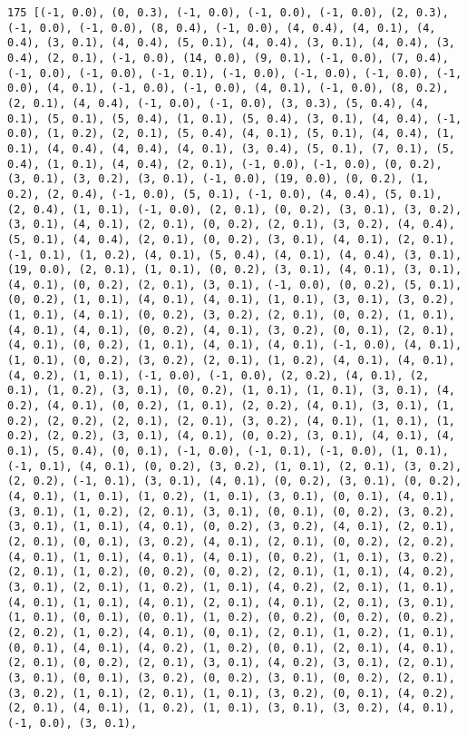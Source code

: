 \documentclass[11pt]{article}
\begin{document}
\begin{Verbatim}[commandchars=\\\{\}]
175 [(-1, 0.0), (0, 0.3), (-1, 0.0), (-1, 0.0), (-1, 0.0), (2, 0.3), (-1, 0.0), (-1, 0.0), (8, 0.4), (-1, 0.0), (4, 0.4), (4, 0.1), (4, 0.4), (3, 0.1), (4, 0.4), (5, 0.1), (4, 0.4), (3, 0.1), (4, 0.4), (3, 0.4), (2, 0.1), (-1, 0.0), (14, 0.0), (9, 0.1), (-1, 0.0), (7, 0.4), (-1, 0.0), (-1, 0.0), (-1, 0.1), (-1, 0.0), (-1, 0.0), (-1, 0.0), (-1, 0.0), (4, 0.1), (-1, 0.0), (-1, 0.0), (4, 0.1), (-1, 0.0), (8, 0.2), (2, 0.1), (4, 0.4), (-1, 0.0), (-1, 0.0), (3, 0.3), (5, 0.4), (4, 0.1), (5, 0.1), (5, 0.4), (1, 0.1), (5, 0.4), (3, 0.1), (4, 0.4), (-1, 0.0), (1, 0.2), (2, 0.1), (5, 0.4), (4, 0.1), (5, 0.1), (4, 0.4), (1, 0.1), (4, 0.4), (4, 0.4), (4, 0.1), (3, 0.4), (5, 0.1), (7, 0.1), (5, 0.4), (1, 0.1), (4, 0.4), (2, 0.1), (-1, 0.0), (-1, 0.0), (0, 0.2), (3, 0.1), (3, 0.2), (3, 0.1), (-1, 0.0), (19, 0.0), (0, 0.2), (1, 0.2), (2, 0.4), (-1, 0.0), (5, 0.1), (-1, 0.0), (4, 0.4), (5, 0.1), (2, 0.4), (1, 0.1), (-1, 0.0), (2, 0.1), (0, 0.2), (3, 0.1), (3, 0.2), (3, 0.1), (4, 0.1), (2, 0.1), (0, 0.2), (2, 0.1), (3, 0.2), (4, 0.4), (5, 0.1), (4, 0.4), (2, 0.1), (0, 0.2), (3, 0.1), (4, 0.1), (2, 0.1), (-1, 0.1), (1, 0.2), (4, 0.1), (5, 0.4), (4, 0.1), (4, 0.4), (3, 0.1), (19, 0.0), (2, 0.1), (1, 0.1), (0, 0.2), (3, 0.1), (4, 0.1), (3, 0.1), (4, 0.1), (0, 0.2), (2, 0.1), (3, 0.1), (-1, 0.0), (0, 0.2), (5, 0.1), (0, 0.2), (1, 0.1), (4, 0.1), (4, 0.1), (1, 0.1), (3, 0.1), (3, 0.2), (1, 0.1), (4, 0.1), (0, 0.2), (3, 0.2), (2, 0.1), (0, 0.2), (1, 0.1), (4, 0.1), (4, 0.1), (0, 0.2), (4, 0.1), (3, 0.2), (0, 0.1), (2, 0.1), (4, 0.1), (0, 0.2), (1, 0.1), (4, 0.1), (4, 0.1), (-1, 0.0), (4, 0.1), (1, 0.1), (0, 0.2), (3, 0.2), (2, 0.1), (1, 0.2), (4, 0.1), (4, 0.1), (4, 0.2), (1, 0.1), (-1, 0.0), (-1, 0.0), (2, 0.2), (4, 0.1), (2, 0.1), (1, 0.2), (3, 0.1), (0, 0.2), (1, 0.1), (1, 0.1), (3, 0.1), (4, 0.2), (4, 0.1), (0, 0.2), (1, 0.1), (2, 0.2), (4, 0.1), (3, 0.1), (1, 0.2), (2, 0.2), (2, 0.1), (2, 0.1), (3, 0.2), (4, 0.1), (1, 0.1), (1, 0.2), (2, 0.2), (3, 0.1), (4, 0.1), (0, 0.2), (3, 0.1), (4, 0.1), (4, 0.1), (5, 0.4), (0, 0.1), (-1, 0.0), (-1, 0.1), (-1, 0.0), (1, 0.1), (-1, 0.1), (4, 0.1), (0, 0.2), (3, 0.2), (1, 0.1), (2, 0.1), (3, 0.2), (2, 0.2), (-1, 0.1), (3, 0.1), (4, 0.1), (0, 0.2), (3, 0.1), (0, 0.2), (4, 0.1), (1, 0.1), (1, 0.2), (1, 0.1), (3, 0.1), (0, 0.1), (4, 0.1), (3, 0.1), (1, 0.2), (2, 0.1), (3, 0.1), (0, 0.1), (0, 0.2), (3, 0.2), (3, 0.1), (1, 0.1), (4, 0.1), (0, 0.2), (3, 0.2), (4, 0.1), (2, 0.1), (2, 0.1), (0, 0.1), (3, 0.2), (4, 0.1), (2, 0.1), (0, 0.2), (2, 0.2), (4, 0.1), (1, 0.1), (4, 0.1), (4, 0.1), (0, 0.2), (1, 0.1), (3, 0.2), (2, 0.1), (1, 0.2), (0, 0.2), (0, 0.2), (2, 0.1), (1, 0.1), (4, 0.2), (3, 0.1), (2, 0.1), (1, 0.2), (1, 0.1), (4, 0.2), (2, 0.1), (1, 0.1), (4, 0.1), (1, 0.1), (4, 0.1), (2, 0.1), (4, 0.1), (2, 0.1), (3, 0.1), (1, 0.1), (0, 0.1), (0, 0.1), (1, 0.2), (0, 0.2), (0, 0.2), (0, 0.2), (2, 0.2), (1, 0.2), (4, 0.1), (0, 0.1), (2, 0.1), (1, 0.2), (1, 0.1), (0, 0.1), (4, 0.1), (4, 0.2), (1, 0.2), (0, 0.1), (2, 0.1), (4, 0.1), (2, 0.1), (0, 0.2), (2, 0.1), (3, 0.1), (4, 0.2), (3, 0.1), (2, 0.1), (3, 0.1), (0, 0.1), (3, 0.2), (0, 0.2), (3, 0.1), (0, 0.2), (2, 0.1), (3, 0.2), (1, 0.1), (2, 0.1), (1, 0.1), (3, 0.2), (0, 0.1), (4, 0.2), (2, 0.1), (4, 0.1), (1, 0.2), (1, 0.1), (3, 0.1), (3, 0.2), (4, 0.1), (-1, 0.0), (3, 0.1), 
\end{Verbatim}
\end{document}
